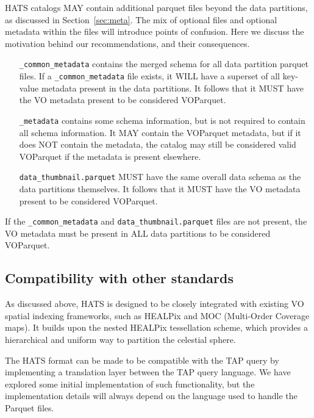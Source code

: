 \documentclass[11pt,a4paper]{ivoa}
\begin{document}
HATS catalogs MAY contain additional parquet files beyond the data partitions, as discussed in Section~\ref{sec:meta}. 
The mix of optional files and optional metadata within the files will introduce points of confusion. 
Here we discuss the motivation behind our recommendations, and their consequences.\par

\begin{itemize}
  \item[\texttt{\_common\_metadata}] contains the merged schema for all data partition parquet files.
  If a \texttt{\_common\_metadata} file exists, it WILL have a superset of all key-value metadata present in the data partitions. 
  It follows that it MUST have the VO metadata present to be considered VOParquet.
  \item[\texttt{\_metadata}] contains some schema information, but is not required to contain all schema information.
  It MAY contain the VOParquet metadata, but if it does NOT contain the metadata, the catalog may still be considered valid VOParquet if the metadata is present elsewhere.
  \item[\texttt{data\_thumbnail.parquet}] MUST have the same overall data schema as the data partitions themselves.
  It follows that it MUST have the VO metadata present to be considered VOParquet.
\end{itemize}

If the \texttt{\_common\_metadata} and \texttt{data\_thumbnail.parquet} files are not present, the VO metadata must be present in ALL data partitions to be considered VOParquet.


\subsection{Compatibility with other standards}

As discussed above, HATS is designed to be closely integrated with existing VO spatial indexing frameworks, such as HEALPix and MOC (Multi-Order Coverage maps). It builds upon the nested HEALPix tessellation scheme, which provides a hierarchical and uniform way to partition the celestial sphere. \par
The HATS format can be made to be compatible with the TAP query \citep{IVOA:TAP} by implementing a translation layer between the TAP query language. 
We have explored some initial implementation of such functionality, but the implementation details will always depend on the language used to handle the Parquet files. \par
\end{document}
